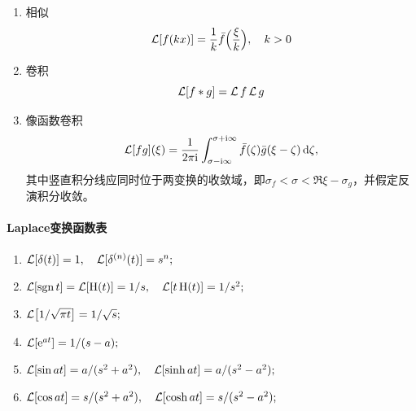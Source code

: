 \begin{enumerate}
\begin{subequations}
\begin{align}
		\end{align}
	\end{subequations}
	\item 相似
	\begin{equation}
		\label{eq:mmp-laplace-dilation}
		\operatorname{\mathcal L}[f(kx)] = \frac1k\bar f\Bigl(\frac\xi{k}\Bigr),\quad k > 0
	\end{equation}
	\item 卷积
	\begin{equation}
		\label{eq:mmp-laplace-convolution}
		\operatorname{\mathcal L}[f \ast g] = \operatorname{\mathcal L} f\operatorname{\mathcal L} g
		\end{equation}
	\item 像函数卷积
	\begin{equation}
		\label{eq:mmp-laplace-product}
		\operatorname{\mathcal L}[fg](\xi) = \frac1{2\pi\mathrm{i}}\int_{\sigma-\mathrm{i}\infty}^{\sigma+\mathrm{i}\infty}\bar f(\zeta)\bar g(\xi - \zeta)\mathop{}\!\mathrm{d}\zeta,
		\end{equation}
	其中竖直积分线应同时位于两变换的收敛域，即$\sigma_f < \sigma < \Re\xi - \sigma_g$，并假定反演积分收敛。
\end{enumerate}
\paragraph{Laplace变换函数表}
\begin{enumerate}
	\item $\operatorname{\mathcal L}[\delta(t)] = 1,\quad \operatorname{\mathcal L}[\delta^{(n)}(t)] = s^n;$
	\item $\operatorname{\mathcal L}[\operatorname{sgn} t] = \operatorname{\mathcal L}[\operatorname{H}(t)] = 1/s,\quad \operatorname{\mathcal L}[t\operatorname{H}(t)] = 1/s^2;$
	\item $\operatorname{\mathcal L}\bigl[1/\sqrt{\pi t}\bigr] = 1/\sqrt{s};$%
	\item $\operatorname{\mathcal L}[\mathop{}\!\mathrm{e}^{at}] = 1/(s - a);$
	\item $\operatorname{\mathcal L}[\sin at] = a/(s^2 + a^2),\quad \operatorname{\mathcal L}[\sinh at] = a/(s^2 - a^2);$
	\item $\operatorname{\mathcal L}[\cos at] = s/(s^2 + a^2),\quad \operatorname{\mathcal L}[\cosh at] = s/(s^2 - a^2);$
\end{enumerate}

